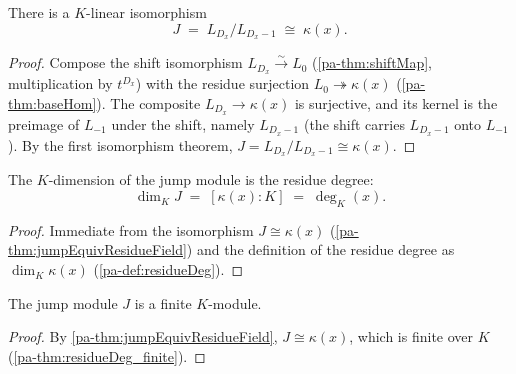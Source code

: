 \begin{theorem}
  \label{pa-thm:jumpEquivResidueField}
  \leanok

  There is a \(K\)-linear isomorphism
  \[
    J \;=\; L_{D_x}\big/L_{D_x - 1} \;\cong\; \kappa(x).
  \]
\end{theorem}
\begin{proof}
  \leanok
  Compose the shift isomorphism \(L_{D_x} \xrightarrow{\sim} L_0\) (\ref{pa-thm:shiftMap},
  multiplication by \(t^{D_x}\)) with the residue surjection \(L_0 \twoheadrightarrow \kappa(x)\)
  (\ref{pa-thm:baseHom}). The composite \(L_{D_x} \to \kappa(x)\) is surjective, and its kernel is the
  preimage of \(L_{-1}\) under the shift, namely \(L_{D_x - 1}\) (the shift carries \(L_{D_x-1}\)
  onto \(L_{-1}\)). By the first isomorphism theorem, \(J = L_{D_x}/L_{D_x-1} \cong \kappa(x)\).
\end{proof}

\begin{theorem}
  \label{pa-thm:finrank_jumpModule}
  \leanok

  The \(K\)-dimension of the jump module is the residue degree:
  \[
    \dim_K J \;=\; [\kappa(x):K] \;=\; \deg_K(x).
  \]
\end{theorem}
\begin{proof}
  \leanok
  Immediate from the isomorphism \(J \cong \kappa(x)\) (\ref{pa-thm:jumpEquivResidueField}) and the
  definition of the residue degree as \(\dim_K \kappa(x)\) (\ref{pa-def:residueDeg}).
\end{proof}

\begin{corollary}
  \label{pa-cor:moduleFinite_jumpModule}
  \leanok

  The jump module \(J\) is a finite \(K\)-module.
\end{corollary}
\begin{proof}
  \leanok
  By \ref{pa-thm:jumpEquivResidueField}, \(J \cong \kappa(x)\), which is finite over \(K\)
  (\ref{pa-thm:residueDeg_finite}).
\end{proof}

